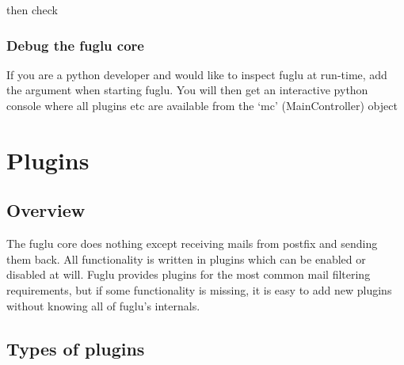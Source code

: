 \documentclass[letterpaper,10pt,english]{sphinxmanual}
\begin{document}
then check 


\subsection{Debug the fuglu core}
\label{operation-index:debug-the-fuglu-core}
If you are a python developer and would like to inspect fuglu at run-time, add the argument  when starting fuglu.
You will then get an interactive python console where all plugins etc are available from the `mc' (MainController) object


\chapter{Plugins}
\label{plugins-index::doc}\label{plugins-index:plugins}

\section{Overview}
\label{plugins-index:overview}
The fuglu core does nothing except receiving mails from postfix and sending them back. All functionality
is written in plugins which can be enabled or disabled at will. Fuglu provides plugins for the most common
mail filtering requirements, but if some functionality is missing, it is easy to add new plugins without knowing
all of fuglu's internals.


\section{Types of plugins}
\label{plugins-index:types-of-plugins}
\end{document}
